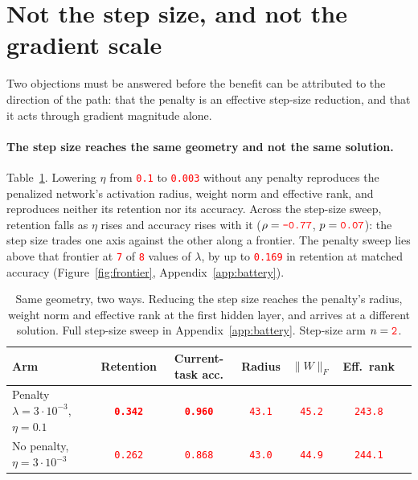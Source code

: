 \documentclass[anon]{opt2026}     %
\newcommand{\PH}[1]{\textcolor{red}{\texttt{#1}}}   %
\begin{document}
\section{Not the step size, and not the gradient scale}
\label{sec:controls}

Two objections must be answered before the benefit can be attributed to the
direction of the path: that the penalty is an effective step-size reduction,
and that it acts through gradient magnitude alone.

\paragraph{The step size reaches the same geometry and not the same solution.}
Table~\ref{tab:lr}. Lowering $\eta$ from \PH{0.1} to \PH{0.003} without any
penalty reproduces the penalized network's activation radius, weight norm and
effective rank, and reproduces neither its retention nor its accuracy. Across
the step-size sweep, retention falls as $\eta$ rises and accuracy rises with it
($\rho = \PH{-0.77}$, $p = \PH{0.07}$): the step size trades one axis against
the other along a frontier. The penalty sweep lies above that frontier at
\PH{7} of \PH{8} values of $\lambda$, by up to \PH{0.169} in retention at
matched accuracy (Figure~\ref{fig:frontier}, Appendix~\ref{app:battery}).

\begin{table}[!tb]
\centering
\caption{Same geometry, two ways. Reducing the step size reaches the penalty's
radius, weight norm and effective rank at the first hidden layer, and arrives at
a different solution. Full step-size sweep in Appendix~\ref{app:battery}.
Step-size arm $n = \PH{2}$.}
\label{tab:lr}
\small
\begin{tabular}{lcccccc}
\toprule
Arm & Retention & Current-task acc. & Radius & $\|W\|_F$ & Eff.\ rank \\
\midrule
Penalty $\lambda = 3\cdot10^{-3}$, $\eta = 0.1$ & \textbf{\PH{0.342}} & \textbf{\PH{0.960}} & \PH{43.1} & \PH{45.2} & \PH{243.8} \\
No penalty, $\eta = 3\cdot10^{-3}$  & \PH{0.262} & \PH{0.868} & \PH{43.0} & \PH{44.9} & \PH{244.1} \\
\bottomrule
\end{tabular}
\end{table}
\end{document}
